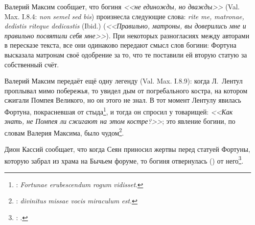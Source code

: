 



Валерий Максим сообщает, что богиня \textit{<<не единожды, но дважды>>} (Val. Max. I.8.4: \textit{non semel sed bis}) произнесла следующие слова: \textit{rite me, matronae, dedistis riteque dedicastis} (Ibid.) (\textit{<<Правильно, матроны, вы доверились мне и правильно посвятили себя мне>>}). При некоторых разногласиях между авторами в пересказе текста, все они одинаково передают смысл слов богини: Фортуна высказала матронам своё одобрение за то, что те поставили ей вторую статую за собственный счёт.

Валерий Максим передаёт ещё одну легенду (Val. Max. I.8.9): когда Л.~Лентул проплывал мимо побережья, то увидел дым от погребального костра, на котором сжигали Помпея Великого, но он этого не знал. В тот момент Лентулу явилась Фортуна, покрасневшая от стыда\footnote{: \textit{Fortunae erubescendum rogum vidisset}.}, и тогда он спросил у товарищей: \textit{<<Как знать, не Помпея ли сжигают на этом костре?>>}; это явление богини, по словам Валерия Максима, было чудом\footnote{: \textit{divinitus missae vocis miraculum est}.}.

Дион Кассий сообщает, что когда Сеян приносил жертвы перед статуей Фортуны, которую забрал из храма на Бычьем форуме, то богиня отвернулась () от него\footnote{: .}.

